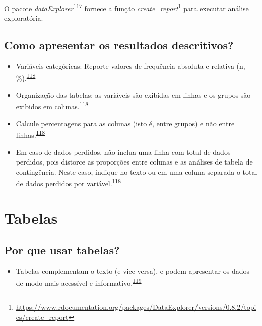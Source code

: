 \documentclass[
]{book}
\providecommand{\tightlist}{%
  \setlength{\itemsep}{0pt}\setlength{\parskip}{0pt}}
\renewcommand{\href}[2]{#2\footnote{\url{#1}}}
\newenvironment{infobox}[1]
  {
  \begin{itemize}
  \renewcommand{\labelitemi}{
    \raisebox{-.7\height}[0pt][0pt]{
      {\setkeys{Gin}{width=3em,keepaspectratio}
        \texttt{[image: \#1]}}
    }
  }
  \setlength{\fboxsep}{1em}
  \begin{blackbox}
  \item
  }
  {
  \end{blackbox}
  \end{itemize}
  }
\begin{document}
\begin{infobox}{images/Rlogo}
O pacote \emph{dataExplorer}\textsuperscript{\protect\hyperlink{ref-DataExplorer}{117}} fornece a função \href{https://www.rdocumentation.org/packages/DataExplorer/versions/0.8.2/topics/create_report}{\emph{create\_report}} para executar análise exploratória.

\end{infobox}

\hypertarget{como-apresentar-os-resultados-descritivos}{%
\subsection{Como apresentar os resultados descritivos?}\label{como-apresentar-os-resultados-descritivos}}

\begin{itemize}
\item
  Variáveis categóricas: Reporte valores de frequência absoluta e relativa (n, \%).\textsuperscript{\protect\hyperlink{ref-Cummings2003}{118}}
\item
  Organização das tabelas: as variáveis são exibidas em linhas e os grupos são exibidos em colunas.\textsuperscript{\protect\hyperlink{ref-Cummings2003}{118}}
\item
  Calcule percentagens para as colunas (isto é, entre grupos) e não entre linhas.\textsuperscript{\protect\hyperlink{ref-Cummings2003}{118}}
\item
  Em caso de dados perdidos, não inclua uma linha com total de dados perdidos, pois distorce as proporções entre colunas e as análises de tabela de contingência. Neste caso, indique no texto ou em uma coluna separada o total de dados perdidos por variável.\textsuperscript{\protect\hyperlink{ref-Cummings2003}{118}}
\end{itemize}

\hypertarget{tabelas}{%
\section{Tabelas}\label{tabelas}}

\hypertarget{por-que-usar-tabelas}{%
\subsection{Por que usar tabelas?}\label{por-que-usar-tabelas}}

\begin{itemize}
\tightlist
\item
  Tabelas complementam o texto (e vice-versa), e podem apresentar os dados de modo mais acessível e informativo.\textsuperscript{\protect\hyperlink{ref-Inskip2017}{119}}
\end{itemize}
\end{document}
